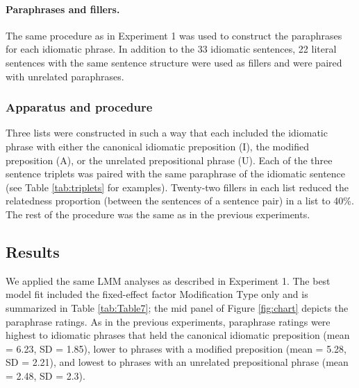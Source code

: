 \paragraph{Paraphrases and fillers.}
The same procedure as in Experiment 1 was used to construct the paraphrases for each idiomatic phrase. In addition to the 33 idiomatic sentences, 22 literal sentences with the same sentence structure were used as fillers and were paired with unrelated paraphrases.

\subsubsection{Apparatus and procedure}

Three lists were constructed in such a way that each included the idiomatic phrase with either the canonical idiomatic preposition (I), the modified preposition (A), or the unrelated prepositional phrase (U). Each of the three sentence triplets was paired with the same paraphrase of the idiomatic sentence (see Table \ref{tab:triplets} for examples). Twenty-two fillers in each list reduced the relatedness proportion (between the sentences of a sentence pair) in a list to 40\%. The rest of the procedure was the same as in the previous experiments. 

\subsection{Results}

We applied the same LMM analyses as described in Experiment 1. The best model fit included the fixed-effect factor Modification Type only and is summarized in Table \ref{tab:Table7}; the mid panel of Figure \ref{fig:chart} depicts the paraphrase ratings. As in the previous experiments, paraphrase ratings were highest to idiomatic phrases that held the canonical idiomatic preposition (mean = 6.23, SD = 1.85), lower to phrases with a modified preposition (mean = 5.28, SD = 2.21), and lowest to phrases with an unrelated prepositional phrase (mean = 2.48, SD = 2.3).

